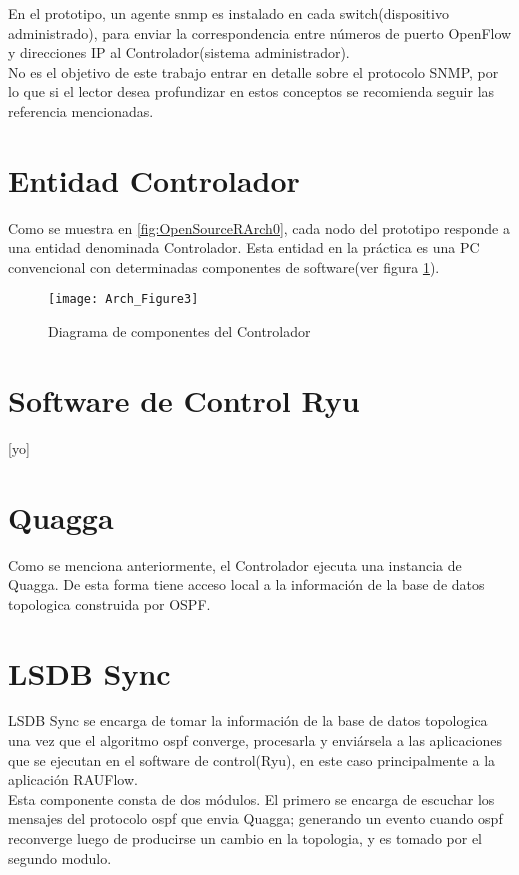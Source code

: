 En el prototipo, un agente snmp es instalado en cada switch(dispositivo administrado), para enviar la correspondencia entre números de puerto OpenFlow y direcciones IP al Controlador(sistema administrador).\\

No es el objetivo de este trabajo entrar en detalle sobre el protocolo SNMP, por lo que si el lector desea profundizar en estos conceptos se recomienda seguir las referencia mencionadas.\\

\section{Entidad Controlador}
Como se muestra en \ref{fig:OpenSourceRArch0}, cada nodo del prototipo responde a una entidad denominada Controlador. Esta entidad en la pr\'actica es una PC convencional con determinadas componentes de software(ver figura \ref{fig:OpenSourceRArch3}).

\begin{figure}[htbp!] 
\centering    
\texttt{[image: Arch\_Figure3]}
\caption[OpenSourceRArch3]{Diagrama de componentes del Controlador}
\label{fig:OpenSourceRArch3}
\end{figure}

\section{Software de Control Ryu}
[yo]

\section{Quagga}
Como se menciona anteriormente, el Controlador ejecuta una instancia de Quagga. De esta forma tiene acceso local a la información de la base de datos topologica construida por OSPF.

\section{LSDB Sync}
LSDB Sync se encarga de tomar la información de la base de datos topologica una vez que el algoritmo ospf converge, procesarla y enviársela a las aplicaciones que se ejecutan en el software de control(Ryu), en este caso principalmente a la aplicación RAUFlow.\\

Esta componente consta de dos módulos. El primero se encarga de escuchar los mensajes del protocolo ospf que envia Quagga; generando un evento cuando ospf reconverge luego de producirse un cambio en la topologia, y es tomado por el segundo modulo.\\

